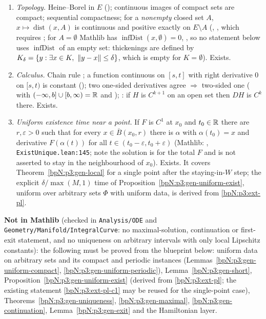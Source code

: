 {\begin{enumerate}[label=(E\arabic*),leftmargin=2.2em]
  with $\norm{DF}\le L$, $F$ is $L$-Lipschitz there; for a function of one variable with derivative bounded by $M$ on an
  interval, $\norm{\alpha(u)-\alpha(s)}\le M\abs{u-s}$. Exists.
\item\label{bpN:p3:ext-compact} \emph{Topology.} Heine--Borel in $E$ (); continuous images of compact
  sets are compact; sequential compactness; for a \emph{nonempty} closed set $A$, $x\mapsto\operatorname{dist}(x,A)$ is continuous and positive exactly on $E\setminus A$
  (, , which requires ; for $A=\emptyset$ Mathlib has
  $\operatorname{infDist}(x,\emptyset)=0$, , so no statement below uses $\operatorname{infDist}$ of an empty set:
  thickenings are defined by $K_\delta=\{y:\exists x\in K,\ \norm{y-x}\le\delta\}$, which is empty for $K=\emptyset$). Exists.
\item\label{bpN:p3:ext-calc} \emph{Calculus.} Chain rule ; a function continuous on
  $[s,t]$ with right derivative $0$ on $[s,t)$ is constant (); two one-sided
  derivatives agree $\Rightarrow$ two-sided one ( with $(-\infty,b]\cup[b,\infty)=\mathbb{R}$ and
  ); : if $H$ is $C^{k+1}$ on an open set then $DH$ is
  $C^k$ there. Exists.
\item\label{bpN:p3:ext-pl-c1} \emph{Uniform existence time near a point.} If $F$ is $C^1$ at $x_0$ and $t_0\in\mathbb{R}$ there are $r,\varepsilon>0$
  such that for every $x\in\overline B(x_0,r)$ there is $\alpha$ with $\alpha(t_0)=x$ and derivative $F(\alpha(t))$ for all
  $t\in(t_0-\varepsilon,t_0+\varepsilon)$ (Mathlib:
  , \texttt{ExistUnique.lean:145}; note the
  solution is for the total $F$ and is not asserted to stay in the neighbourhood of $x_0$). Exists. It covers Theorem~\ref{bpN:p3:gen-local}
  for a single point after the staying-in-$W$ step; the explicit $\delta/\max(M,1)$ time of Proposition~\ref{bpN:p3:gen-uniform-exist}, uniform over
  arbitrary sets $\Phi$ with uniform data, is derived from \ref{bpN:p3:ext-pl}.
\end{enumerate}}
\textbf{Not in Mathlib} (checked in \texttt{Analysis/ODE} and \texttt{Geometry/Manifold/IntegralCurve}: no maximal-solution, continuation or first-exit statement, and no
uniqueness on arbitrary intervals with only local Lipschitz constants): the following must be proved from the blueprint below:
uniform data on arbitrary sets and its compact and periodic instances (Lemmas~\ref{bpN:p3:gen-uniform-compact}, \ref{bpN:p3:gen-uniform-periodic}),
Lemma~\ref{bpN:p3:gen-short}, Proposition~\ref{bpN:p3:gen-uniform-exist} (derived from \ref{bpN:p3:ext-pl}; the existing statement
\ref{bpN:p3:ext-pl-c1} may be reused for the single-point case), Theorems~\ref{bpN:p3:gen-uniqueness}, \ref{bpN:p3:gen-maximal},
\ref{bpN:p3:gen-continuation}, Lemma~\ref{bpN:p3:gen-exit} and the Hamiltonian layer.

